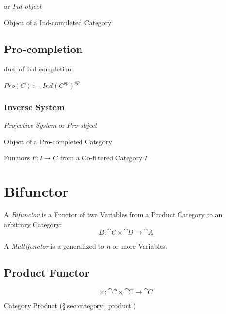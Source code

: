 or \emph{Ind-object}

Object of a Ind-completed Category



\subsection{Pro-completion}\label{sec:pro_completion}

dual of Ind-completion

$Pro(C) := Ind(C^{op})^{op}$



\subsubsection{Inverse System}\label{sec:inverse_system}

\emph{Projective System} or \emph{Pro-object}

Object of a Pro-completed Category

Functors $F : I \to C$ from a Co-filtered Category $I$



\section{Bifunctor}\label{sec:bifunctor}

A \emph{Bifunctor} is a Functor of two Variables from a Product Category to an
arbitrary Category:
\[
  B : \cat{C} \times \cat{D} \rightarrow \cat{A}
\]

A \emph{Multifunctor} is a generalized to $n$ or more Variables.



\subsection{Product Functor}\label{sec:product_functor}

\[
  \times : \cat{C} \times \cat{C} \rightarrow \cat{C}
\]

Category Product (\S\ref{sec:category_product})



